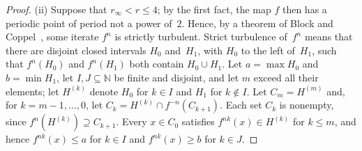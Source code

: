\documentclass[psamsfonts]{amsart}
\theoremstyle{definition}
\theoremstyle{remark}
\numberwithin{equation}{section}
\begin{document}
\begin{proof}
(ii) Suppose that $r_\infty<r\le4$; by the first fact, the map $f$ then has a periodic point of period not a power of~$2$.
Hence, by a theorem of Block and Coppel~\cite[Chapter~II]{BlockCoppel1992}, some iterate $f^n$ is strictly turbulent.
Strict turbulence of~$f^n$ means that there are disjoint closed intervals $H_0$ and~$H_1$, with $H_0$ to the left of~$H_1$, such that $f^n(H_0)$ and $f^n(H_1)$ both contain $H_0\cup H_1$.
Let $a=\max H_0$ and $b=\min H_1$, let $I,J\subseteq\mathbb{N}$ be finite and disjoint, and let $m$ exceed all their elements;
let $H^{(k)}$ denote $H_0$ for $k\in I$ and $H_1$ for $k\notin I$.
Let $C_m=H^{(m)}$ and, for $k=m-1,\dots,0$, let $C_k=H^{(k)}\cap f^{-n}(C_{k+1})$.
Each set $C_k$ is nonempty, since $f^n(H^{(k)})\supseteq C_{k+1}$.
Every $x\in C_0$ satisfies $f^{nk}(x)\in H^{(k)}$ for $k\le m$, and hence $f^{nk}(x)\le a$ for $k\in I$ and $f^{nk}(x)\ge b$ for $k\in J$.
\end{proof}
\end{document}

